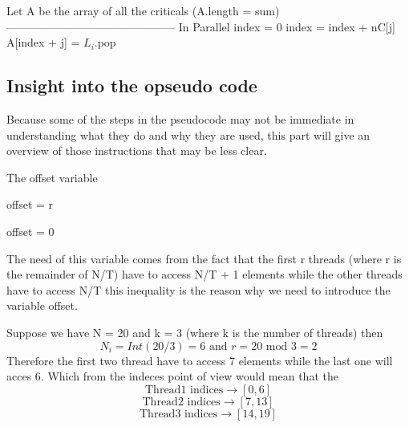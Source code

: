 \documentclass{report}
\begin{document}
{\begin{minipage}[b]{0.48\textwidth}
\begin{algorithm}[H]
\begin{algorithmic}
        \State Let A be the array of all the criticals (A.length = sum)
        \State --------------------------------------------- \Comment In Parallel 
        \State index = 0
          \State index = index + nC[j]
        \EndFor
        \State 
          \State A[index + j] = $L_i$.pop 
        \EndFor
      \end{algorithmic}
  \end{algorithm}
  \end{minipage}}

  \newpage

  \begin{minipage}[b]{0.48\textwidth}
    \subsection*{Insight into the opseudo code}
    Because some of the steps in the pseudocode may not be immediate in understanding what they do and why they are used, this part will give an overview of those instructions that may be less clear.

    \begin{algorithm}[H]
      \caption{The offset variable}
      \begin{algorithmic}
        \State offset = r

          \State offset = 0
        \EndIf
      \end{algorithmic}
    \end{algorithm}

    The need of this variable comes from the fact that the first r threads (where r is the remainder of N/T) have to access N/T + 1 elements while the other threads have to access N/T this inequality is the reason why we need to introduce the variable offset.

    Suppose we have N = 20 and k = 3 (where k is the number of threads) then
    \begin{equation*}
      N_i = Int(20 / 3) = 6 \text{ and } r = 20 \text{ mod } 3 = 2
    \end{equation*}
    Therefore the first two thread have to access 7 elements while the last one will acces 6. Which from the indeces point of view would mean that the
    \begin{equation*}
      \text{Thread1 indices} \rightarrow [0, 6]
    \end{equation*}
    \begin{equation*}
      \text{Thread2 indices} \rightarrow [7, 13]
    \end{equation*}
    \begin{equation*}
      \text{Thread3 indices} \rightarrow [14, 19]
    \end{equation*}


\end{minipage}
\end{document}
